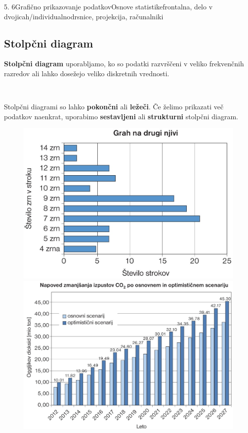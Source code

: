 \begin{priprava}{5. 6}{}{Grafično prikazovanje podatkov}{Osnove statistike}{frontalna, delo v dvojicah/individualno}{drsnice, projekcija, računalniki}
        ~

    \subsection*{Stolpčni diagram}

        \textbf{Stolpčni diagram} uporabljamo, ko so podatki razvrščeni v veliko frekvenčnih razredov
        ali lahko dosežejo veliko diskretnih vrednosti.
        
        ~
            
        Stolpčni diagrami so lahko \textbf{pokončni} ali \textbf{ležeči}. 
        Če želimo prikazati več podatkov naenkrat, uporabimo \textbf{sestavljeni} ali \textbf{strukturni} stolpčni diagram.
    
        
        \begin{figure}[H]
            \includegraphics[scale=0.3]{../../Slike_in_skice/1093.jpg}
            \includegraphics[scale=0.22]{../../Slike_in_skice/1095.jpg}

\end{figure}
\end{priprava}
